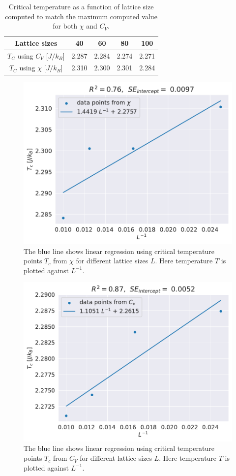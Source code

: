 \documentclass[english,notitlepage,reprint,nofootinbib]{revtex4-1}  %
\begin{document}
\begin{table}
    \centering
    \caption{Critical temperature as a function of lattice size computed to match the maximum computed value for both $\chi$ and $C_V$.}
    \label{tab:critical_T}
    \begin{tabular}{|c|c|c|c|c|}
        \hline
        Lattice sizes                & 40    & 60    & 80    & 100   \\
        \hline
        $T_C$ using $C_V$ [$J/k_B$]  & 2.287 & 2.284 & 2.274 & 2.271 \\
        \hline
        $T_C$ using $\chi$ [$J/k_B$] & 2.310 & 2.300 & 2.301 & 2.284 \\
        \hline
    \end{tabular}
\end{table}
\begin{figure}[H]
    \centering
    \includegraphics[width=.5\textwidth]{../figures/linregress_X.pdf}
    \caption{The blue line shows linear regression using critical temperature points $T_c$ from $\chi$ for different lattice sizes $L$. Here temperature $T$ is plotted against $L^{-1}$.}
    \label{fig:linregress_X}
\end{figure}
\begin{figure}[H]
    \centering
    \includegraphics[width=.5\textwidth]{../figures/linregress_cv.pdf}
    \caption{The blue line shows linear regression using critical temperature points $T_c$ from $C_V$ for different lattice sizes $L$. Here temperature $T$ is plotted against $L^{-1}$.}
    \label{fig:linregress_cv}
\end{figure}
\end{document}

